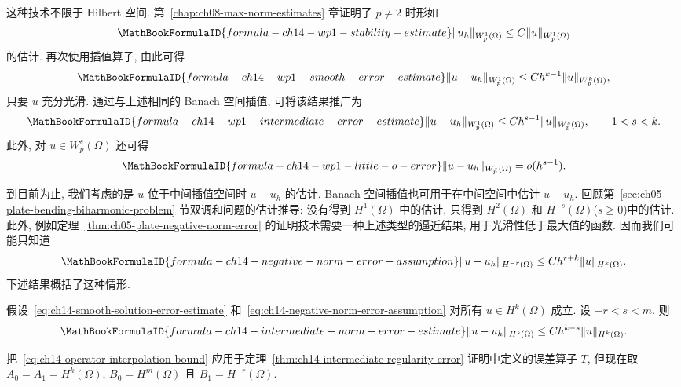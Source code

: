 这种技术不限于 Hilbert 空间. 第~\ref{chap:ch08-max-norm-estimates} 章证明了 $p\neq2$ 时形如
\begin{equation}
\MathBookFormulaID{formula-ch14-wp1-stability-estimate}
\label{eq:ch14-wp1-stability-estimate}
\|u_h\|_{W_p^1(\Omega)}\leq C\|u\|_{W_p^1(\Omega)}
\end{equation}
的估计. 再次使用插值算子, 由此可得
\begin{equation}
\MathBookFormulaID{formula-ch14-wp1-smooth-error-estimate}
\label{eq:ch14-wp1-smooth-error-estimate}
\|u-u_h\|_{W_p^1(\Omega)}\leq Ch^{k-1}\|u\|_{W_p^k(\Omega)},
\end{equation}
只要 $u$ 充分光滑. 通过与上述相同的 Banach 空间插值, 可将该结果推广为
\begin{equation}
\MathBookFormulaID{formula-ch14-wp1-intermediate-error-estimate}
\label{eq:ch14-wp1-intermediate-error-estimate}
\|u-u_h\|_{W_p^1(\Omega)}\leq Ch^{s-1}\|u\|_{W_p^s(\Omega)},
\qquad 1<s<k.
\end{equation}
此外, 对 $u\in W_p^s(\Omega)$ 还可得
\begin{equation}
\MathBookFormulaID{formula-ch14-wp1-little-o-error}
\label{eq:ch14-wp1-little-o-error}
\|u-u_h\|_{W_p^1(\Omega)}=o(h^{s-1}).
\end{equation}

到目前为止, 我们考虑的是 $u$ 位于中间插值空间时 $u-u_h$ 的估计. Banach 空间插值也可用于在中间空间中估计 $u-u_h$. 回顾第~\ref{sec:ch05-plate-bending-biharmonic-problem} 节双调和问题的估计推导: 没有得到 $H^1(\Omega)$ 中的估计, 只得到 $H^2(\Omega)$ 和 $H^{-s}(\Omega)$($s\geq0$)中的估计. 此外, 例如定理~\ref{thm:ch05-plate-negative-norm-error} 的证明技术需要一种上述类型的逼近结果, 用于光滑性低于最大值的函数. 因而我们可能只知道
\begin{equation}
\MathBookFormulaID{formula-ch14-negative-norm-error-assumption}
\label{eq:ch14-negative-norm-error-assumption}
\|u-u_h\|_{H^{-r}(\Omega)}\leq Ch^{r+k}\|u\|_{H^k(\Omega)}.
\end{equation}
下述结果概括了这种情形.

\begin{Theorem}
\label{thm:ch14-intermediate-norm-error}
假设~\eqref{eq:ch14-smooth-solution-error-estimate} 和~\eqref{eq:ch14-negative-norm-error-assumption} 对所有 $u\in H^k(\Omega)$ 成立. 设 $-r<s<m$. 则
\[
\MathBookFormulaID{formula-ch14-intermediate-norm-error-estimate}
\|u-u_h\|_{H^s(\Omega)}\leq Ch^{k-s}\|u\|_{H^k(\Omega)}.
\]
\end{Theorem}

\begin{Proof}
把~\eqref{eq:ch14-operator-interpolation-bound} 应用于定理~\ref{thm:ch14-intermediate-regularity-error} 证明中定义的误差算子 $T$, 但现在取 $A_0=A_1=H^k(\Omega)$, $B_0=H^m(\Omega)$ 且 $B_1=H^{-r}(\Omega)$.
\end{Proof}
